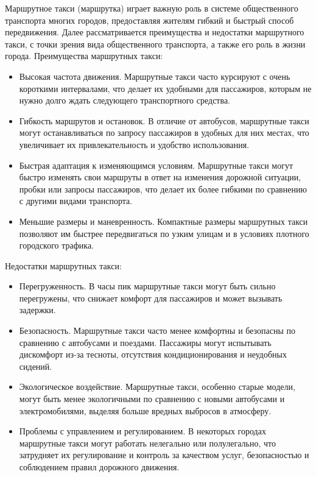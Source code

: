 Маршрутное такси (маршрутка) играет важную роль в системе общественного транспорта многих городов, предоставляя жителям гибкий и быстрый способ передвижения. Далее рассматривается преимущества и недостатки маршрутного такси, с точки зрения вида общественного транспорта, а также его роль в жизни города.
Преимущества маршрутных такси:
\begin{itemize}
	\item Высокая частота движения. Маршрутные такси часто курсируют с очень короткими интервалами, что делает их удобными для пассажиров, которым не нужно долго ждать следующего транспортного средства.
	\item Гибкость маршрутов и остановок. В отличие от автобусов, маршрутные такси могут останавливаться по запросу пассажиров в удобных для них местах, что увеличивает их привлекательность и удобство использования.
	\item Быстрая адаптация к изменяющимся условиям. Маршрутные такси могут быстро изменять свои маршруты в ответ на изменения дорожной ситуации, пробки или запросы пассажиров, что делает их более гибкими по сравнению с другими видами транспорта.
	\item Меньшие размеры и маневренность. Компактные размеры маршрутных такси позволяют им быстрее передвигаться по узким улицам и в условиях плотного городского трафика.
\end{itemize}

Недостатки маршрутных такси:
\begin{itemize}
	\item Перегруженность. В часы пик маршрутные такси могут быть сильно перегружены, что снижает комфорт для пассажиров и может вызывать задержки.
	\item Безопасность. Маршрутные такси часто менее комфортны и безопасны по сравнению с автобусами и поездами. Пассажиры могут испытывать дискомфорт из-за тесноты, отсутствия кондиционирования и неудобных сидений.
	\item Экологическое воздействие. Маршрутные такси, особенно старые модели, могут быть менее экологичными по сравнению с новыми автобусами и электромобилями, выделяя больше вредных выбросов в атмосферу.
	\item Проблемы с управлением и регулированием. В некоторых городах маршрутные такси могут работать нелегально или полулегально, что затрудняет их регулирование и контроль за качеством услуг, безопасностью и соблюдением правил дорожного движения.
\end{itemize}

